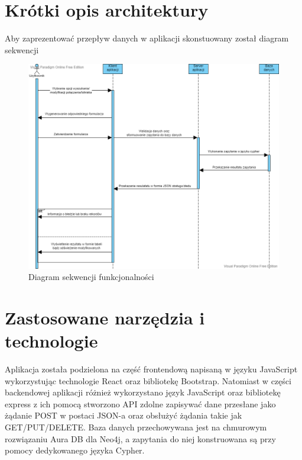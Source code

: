 \documentclass[12pt]{article}
\begin{document}
\section{Krótki opis architektury}
Aby zaprezentować przepływ danych w aplikacji skonstuowany został diagram sekwencji
\begin{figure}[!ht]
    \centering
    \includegraphics[width=0.95\linewidth]{10}  
    \caption{Diagram sekwencji funkcjonalności}
\end{figure}
\section{Zastosowane narzędzia i technologie}
Aplikacja została podzielona na część frontendową napisaną w języku JavaScript wykorzystując technologie React oraz bibliotekę Bootstrap. Natomiast w części backendowej aplikacji różnież wykorzystano język JavaScript oraz bibliotekę express z ich pomocą stworzono API zdolne zapisywać dane przesłane jako żądanie POST w postaci JSON-a oraz obsłużyć żądania takie jak GET/PUT/DELETE.
Baza danych przechowywana jest na chmurowym rozwiązaniu Aura DB dla Neo4j, a zapytania do niej konstruowana są przy pomocy dedykowanego języka Cypher.
\newpage
\end{document}
